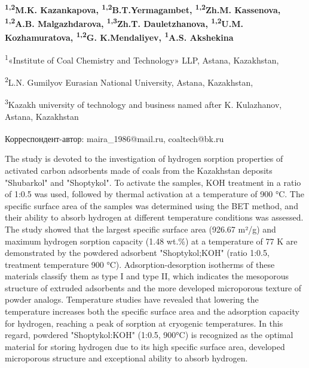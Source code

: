 
\begin{articleheader}

{\bfseries
\textsuperscript{1,2}M.K. Kazankapova\textsuperscript{\envelope },
\textsuperscript{1,2}B.T.Yermagambet,
\textsuperscript{1,2}Zh.M. Kassenova,
\textsuperscript{1,2}A.B. Malgazhdarova,
\textsuperscript{1,3}Zh.T. Dauletzhanova,
\textsuperscript{1,2}U.M. Kozhamuratova,
\textsuperscript{1,2}G. K.Mendaliyev,
\textsuperscript{1}A.S. Akshekina
}
\end{articleheader}

\begin{affiliation}
\textsuperscript{1}«Institute of Coal Chemistry and Technology» LLP, Astana, Kazakhstan,

\textsuperscript{2}L.N. Gumilyov Eurasian National University, Astana, Kazakhstan,

\textsuperscript{3}Kazakh university of technology and business named after K. Kulazhanov, Astana, Kazakhstan

\raggedright \textsuperscript{\envelope }Корреспондент-автор: maira\_1986@mail.ru, coaltech@bk.ru
\end{affiliation}

The study is devoted to the investigation of hydrogen sorption
properties of activated carbon adsorbents made of coals from the
Kazakhstan deposits "Shubarkol" and "Shoptykol". To activate the
samples, KOH treatment in a ratio of 1:0.5 was used, followed by thermal
activation at a temperature of 900 °C. The specific surface area of
\hspace{0pt}\hspace{0pt}the samples was determined using the BET method,
and their ability to absorb hydrogen at different temperature conditions
was assessed. The study showed that the largest specific surface area
(926.67 m²/g) and maximum hydrogen sorption capacity (1.48 wt.\%) at a
temperature of 77 K are demonstrated by the powdered adsorbent
"Shoptykol;KOH" (ratio 1:0.5, treatment temperature 900 °C).
Adsorption-desorption isotherms of these materials classify them as type
I and type II, which indicates the mesoporous structure of extruded
adsorbents and the more developed microporous texture of powder analogs.
Temperature studies have revealed that lowering the temperature
increases both the specific surface area and the adsorption capacity for
hydrogen, reaching a peak of sorption at cryogenic temperatures. In this
regard, powdered "Shoptykol:KOH" (1:0.5, 900°C) is recognized as the
optimal material for storing hydrogen due to its high specific surface
area, developed microporous structure and exceptional ability to absorb
hydrogen.

